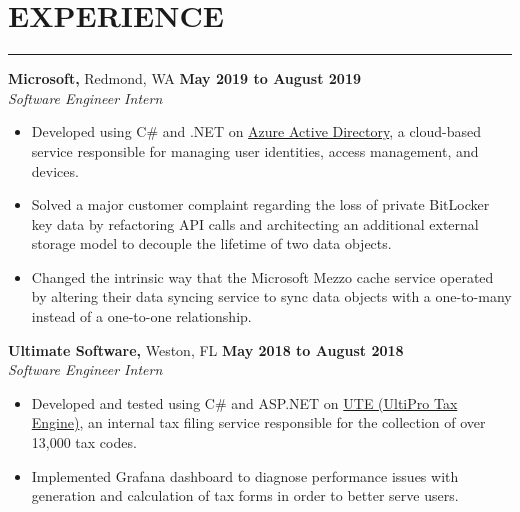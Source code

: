 \section*{EXPERIENCE}

\hrule \relax
\sectionheaderspace

\noindent \textbf{Microsoft,} Redmond, WA \hfill\textbf{May 2019 to August 2019}\\
\textit{Software Engineer Intern}
\begin{itemize}[noitemsep,nolistsep, label = {-}]
	\item Developed using C\# and .NET on \href{https://docs.microsoft.com/en-us/azure/active-directory/fundamentals/active-directory-whatis}{Azure Active Directory}, a cloud-based service responsible for managing user identities, access management, and devices.
	\item Solved a major customer complaint regarding the loss of private BitLocker key data by refactoring API calls and architecting an additional external storage model to decouple the lifetime of two data objects.
	\item Changed the intrinsic way that the Microsoft Mezzo cache service operated by altering their data syncing service to sync data objects with a one-to-many instead of a one-to-one relationship.
\end{itemize}
\subsectionspace

\noindent \textbf{Ultimate Software,} Weston, FL \hfill\textbf{May 2018 to August 2018}\\
\textit{Software Engineer Intern}
\begin{itemize}[noitemsep,nolistsep, label = {-}]
	\item Developed and tested using C\# and ASP.NET on \href{https://www.ultimatesoftware.com/UltiPro-Solution-Features-Payment-Services}{UTE (UltiPro Tax Engine)}, an internal tax filing service responsible for the collection of over 13,000 tax codes.
	\item Implemented Grafana dashboard to diagnose performance issues with generation and calculation of tax forms in order to better serve users.
\end{itemize}
\subsectionspace
